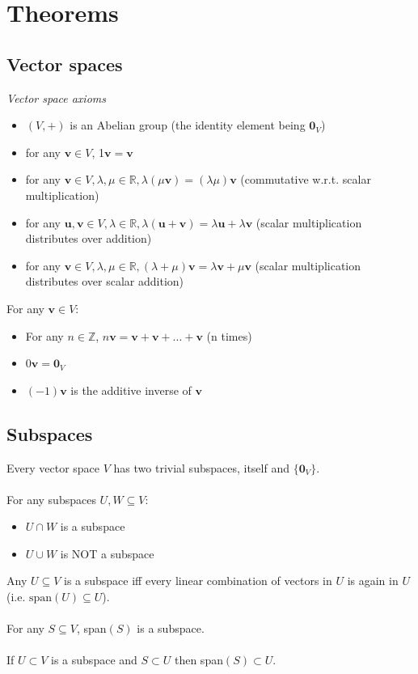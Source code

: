 \documentclass{article}
\newcommand{\R}{\mathbb{R}}
\newcommand{\Z}{\mathbb{Z}}
\renewcommand{\vec}[1]{\mathbf{#1}}
\begin{document}
\section{Theorems}

\subsection{Vector spaces}
\textit{Vector space axioms}
\begin{itemize}
\item $ (V, +) $ is an Abelian group (the identity element being $ \vec{0}_{V} $)
\item for any $ \vec{v} \in V $, 1$ \vec{v} = \vec{v} $
\item for any $ \vec{v} \in V, \lambda, \mu \in \R, \lambda (\mu \vec{v}) = (\lambda \mu) \vec{v} $ (commutative w.r.t. scalar multiplication)
\item for any $ \vec{u}, \vec{v} \in V, \lambda \in \R, \lambda (\vec{u}  + \vec{v}) = \lambda \vec{u}  + \lambda \vec{v} $ (scalar multiplication distributes over addition)
\item for any $ \vec{v} \in V, \lambda, \mu \in \R, (\lambda + \mu) \vec{v} = \lambda \vec{v}  + \mu \vec{v} $ (scalar multiplication distributes over scalar addition)
\end{itemize}
For any $ \vec{v} \in V $:
\begin{itemize}
\item For any $ n \in \Z $, $ n\vec{v} = \vec{v} + \vec{v} + ... + \vec{v} $ (n times)
\item $ 0 \vec{v} = \vec{0}_{V} $
\item $ (-1) \vec{v} $ is the additive inverse of $ \vec{v} $
\end{itemize}

\subsection{Subspaces}
Every vector space $ V $ has two trivial subspaces, itself and $ \{ \vec{0}_{V} \} $.
\\\\
For any subspaces $ U, W \subseteq V $:
\begin{itemize}
\item $ U \cap W $ is a subspace
\item $ U \cup W $ is NOT a subspace
\end{itemize}
Any $ U \subseteq V $ is a subspace iff every linear combination of vectors in $ U $ is again in $ U $ (i.e. $ \textrm{span}(U) \subseteq U $).
\\\\
For any $ S \subseteq V $, span$ (S) $ is a subspace.
\\\\
If $ U  \subset V $ is a subspace and $ S \subset U $ then span$ (S) \subset U $.
\end{document}
